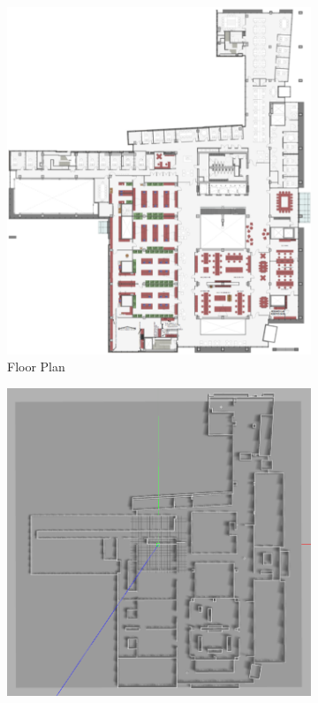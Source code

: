 \documentclass[smallextended]{svjour3}       %
\begin{document}
\begin{figure}[!t]
\centering
    	\begin{subfigure}[t]{0.4\columnwidth}
           	\centering
          	\includegraphics[width=\textwidth]{SEH_cropped.png}
        		\caption{Floor Plan}
    	\end{subfigure}
	\hspace*{0.1\textwidth}
    	\begin{subfigure}[t]{0.4\columnwidth}
           	\centering
          	\includegraphics[width=\textwidth]{gazeboSEH.png}

\end{subfigure}
\end{figure}
\end{document}
